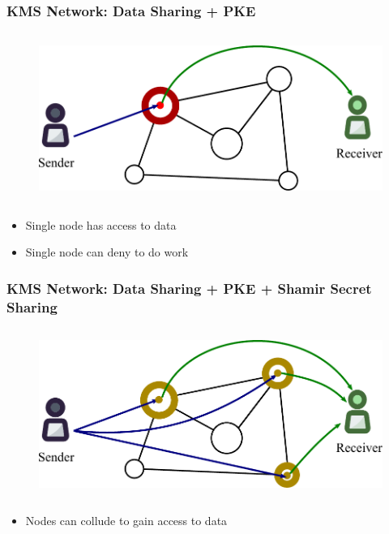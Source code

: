 \documentclass[xetex,mathsans,sans,aspectratio=169]{beamer}
\begin{document}
    \begin{frame}
        \frametitle{KMS Network: Data Sharing + PKE}
        \begin{figure}
            \centering
            \includegraphics[height=5.5cm]{pdf/permissioned.pdf}
        \end{figure}
        \begin{itemize}
            \item Single node has access to data
            \item Single node can deny to do work
        \end{itemize}
    \end{frame}

    \begin{frame}
        \frametitle{KMS Network: Data Sharing + PKE + Shamir Secret Sharing}
        \begin{figure}
            \centering
            \includegraphics[height=5.5cm]{pdf/permissioned-sss.pdf}
        \end{figure}
        \begin{itemize}
            \item Nodes can collude to gain access to data
        \end{itemize}
    \end{frame}
\end{document}
